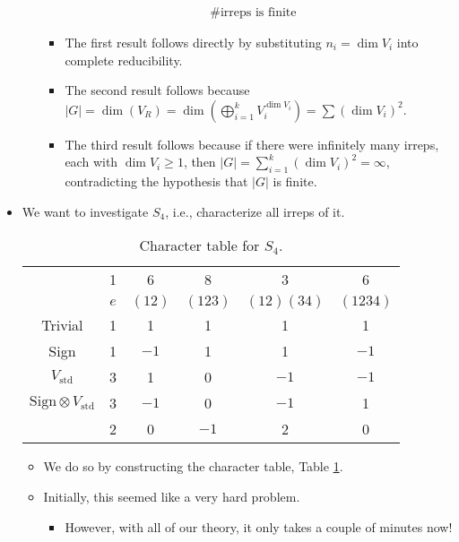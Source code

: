 \documentclass[../notes.tex]{subfiles}
\begin{document}
\begin{itemize}
\begin{itemize}
\begin{align*}
            &\text{\# irreps is finite}
        \end{align*}
        \begin{itemize}
            \item The first result follows directly by substituting $n_i=\dim V_i$ into complete reducibility.
            \item The second result follows because $|G|=\dim(V_R)=\dim(\bigoplus_{i=1}^kV_i^{\dim V_i})=\sum(\dim V_i)^2$.
            \item The third result follows because if there were infinitely many irreps, each with $\dim V_i\geq 1$, then $|G|=\sum_{i=1}^k(\dim V_i)^2=\infty$, contradicting the hypothesis that $|G|$ is finite.
        \end{itemize}
    \end{itemize}
    \item We want to investigate $S_4$, i.e., characterize all irreps of it.
    \begin{table}[h!]
        \centering
        \small
        \renewcommand{\arraystretch}{1.2}
        \begin{tabular}{c|c|c|c|c|c|}
             & 1 & 6 & 8 & 3 & 6\\
             & $e$ & $(12)$ & $(123)$ & $(12)(34)$ & $(1234)$\\ \hline
            Trivial & 1 & 1 & 1 & 1 & 1\\ \hline
            Sign & 1 & $-1$ & 1 & 1 & $-1$\\ \hline
            $V_\text{std}$ & 3 & 1 & 0 & $-1$ & $-1$\\ \hline
            $\text{Sign}\otimes V_\text{std}$ & 3 & $-1$ & 0 & $-1$ & 1\\ \hline
             & 2 & 0 & $-1$ & 2 & 0\\
        \end{tabular}
        \caption{Character table for $S_4$.}
        \label{tab:charTableS4}
    \end{table}
    \begin{itemize}
        \item We do so by constructing the character table, Table \ref{tab:charTableS4}.
        \item Initially, this seemed like a very hard problem.
        \begin{itemize}
            \item However, with all of our theory, it only takes a couple of minutes now!

\end{itemize}
\end{itemize}
\end{itemize}
\end{document}
